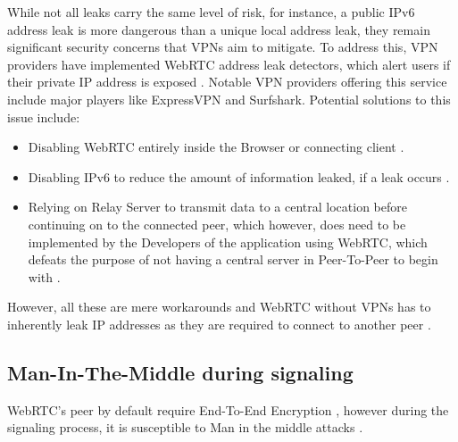 \documentclass[conference]{IEEEtran}
\begin{document}
While not all leaks carry the same level of risk, for instance, a public IPv6 address leak is more dangerous than a unique local address 
leak, they remain significant security concerns that VPNs aim to mitigate. To address this, VPN providers have implemented WebRTC address 
leak detectors, which alert users if their private IP address is exposed \cite{One_leak_will_sink_a_ship}. Notable VPN providers offering this service include major players 
like ExpressVPN and Surfshark. Potential solutions to this issue include:
\begin{itemize}
    \item Disabling WebRTC entirely inside the Browser or connecting client \cite{One_leak_will_sink_a_ship}.
    \item Disabling IPv6 to reduce the amount of information leaked, if a leak occurs \cite{One_leak_will_sink_a_ship}.
    \item Relying on Relay Server to transmit data to a central location before continuing on to the connected peer,
    which however, does need to be implemented by the Developers of the application using WebRTC, which defeats the
    purpose of not having a central server in Peer-To-Peer to begin with \cite{One_leak_will_sink_a_ship}.
\end{itemize}
However, all these are mere workarounds and WebRTC without VPNs has to inherently leak
IP addresses as they are required to connect to another peer \cite{One_leak_will_sink_a_ship}. 

\subsection{Man-In-The-Middle during signaling}
WebRTC's peer by default require End-To-End Encryption \cite{RFC8827}, however during the signaling process,
it is susceptible to Man in the middle attacks \cite{Security_Mechanisms_for_Signaling}. 
\end{document}
